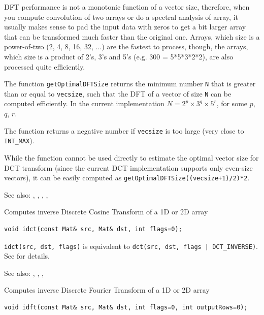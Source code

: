 DFT performance is not a monotonic function of a vector size, therefore, when you compute convolution of two arrays or do a spectral analysis of array, it usually makes sense to pad the input data with zeros to get a bit larger array that can be transformed much faster than the original one.
Arrays, which size is a power-of-two (2, 4, 8, 16, 32, ...) are the fastest to process, though, the arrays, which size is a product of 2's, 3's and 5's (e.g. 300 = 5*5*3*2*2), are also processed quite efficiently.

The function \texttt{getOptimalDFTSize} returns the minimum number \texttt{N} that is greater than or equal to \texttt{vecsize}, such that the DFT
of a vector of size \texttt{N} can be computed efficiently. In the current implementation $N=2^p \times 3^q \times 5^r$, for some $p$, $q$, $r$.

The function returns a negative number if \texttt{vecsize} is too large (very close to \texttt{INT\_MAX}).

While the function cannot be used directly to estimate the optimal vector size for DCT transform (since the current DCT implementation supports only even-size vectors), it can be easily computed as \texttt{getOptimalDFTSize((vecsize+1)/2)*2}.

See also: , , , , 

\label{idct}
Computes inverse Discrete Cosine Transform of a 1D or 2D array

\begin{lstlisting}
void idct(const Mat& src, Mat& dst, int flags=0);
\end{lstlisting}
\begin{description}
\end{description}

\texttt{idct(src, dst, flags)} is equivalent to \texttt{dct(src, dst, flags | DCT\_INVERSE)}.
See  for details.

See also: , , , 


\label{idft}
Computes inverse Discrete Fourier Transform of a 1D or 2D array

\begin{lstlisting}
void idft(const Mat& src, Mat& dst, int flags=0, int outputRows=0);
\end{lstlisting}
\begin{description}
\end{description}

